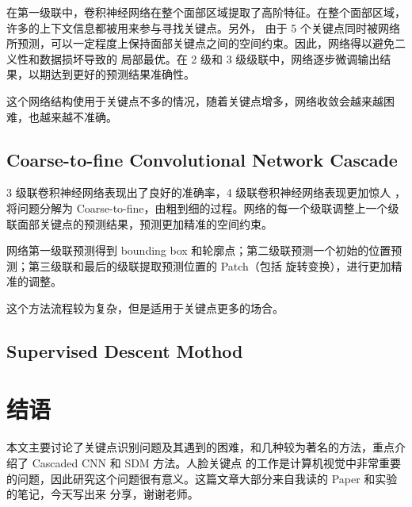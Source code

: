 \documentclass{ctexart}
\begin{document}
在第一级联中，卷积神经网络在整个面部区域提取了高阶特征。在整个面部区域，许多的上下文信息都被用来参与寻找关键点。另外，
由于 5 个关键点同时被网络所预测，可以一定程度上保持面部关键点之间的空间约束。因此，网络得以避免二义性和数据损坏导致的
局部最优。在 2 级和 3 级级联中，网络逐步微调输出结果，以期达到更好的预测结果准确性。

这个网络结构使用于关键点不多的情况，随着关键点增多，网络收敛会越来越困难，也越来越不准确。

\subsection{Coarse-to-fine Convolutional Network Cascade}

3 级联卷积神经网络表现出了良好的准确率，4 级联卷积神经网络表现更加惊人 \cite{cascaded4_cnn}，将问题分解为 Coarse-to-fine，由粗到细的过程。网络的每一个级联调整上一个级联面部关键点的预测结果，预测更加精准的空间约束。

网络第一级联预测得到 bounding box 和轮廓点；第二级联预测一个初始的位置预测；第三级联和最后的级联提取预测位置的 Patch（包括
旋转变换），进行更加精准的调整。

这个方法流程较为复杂，但是适用于关键点更多的场合。

\subsection{Supervised Descent Mothod}

\cite{sdm}

\section{结语}

本文主要讨论了关键点识别问题及其遇到的困难，和几种较为著名的方法，重点介绍了 Cascaded CNN 和 SDM 方法。人脸关键点
的工作是计算机视觉中非常重要的问题，因此研究这个问题很有意义。这篇文章大部分来自我读的 Paper 和实验的笔记，今天写出来
分享，谢谢老师。

\pagebreak

\end{document}

